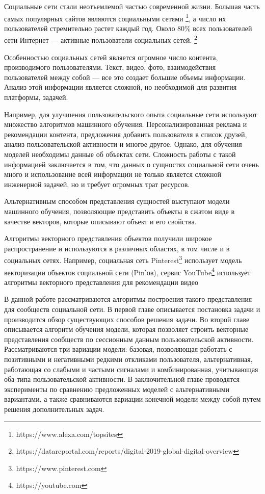 \documentclass[times,specification,annotation]{itmo-student-thesis}
\begin{document}
\startprefacepage

\startrelatedwork

Социальные сети стали неотъемлемой частью современной жизни. Большая часть самых популярных сайтов являются социальными сетями \footnote{https://www.alexa.com/topsites}, а число их пользователей стремительно растет каждый год. Около 80\% всех пользователей сети Интернет --- активные пользователи социальных сетей. \footnote{https://datareportal.com/reports/digital-2019-global-digital-overview}  

Особенностью социальных сетей является огромное число контента, производимого пользователями. Текст, видео, фото, взаимодействия пользователей между собой --- все это создает большие объемы информации. Анализ этой информации является сложной, но необходимой для развития платформы, задачей.

Например, для улучшения пользовательского опыта социальные сети используют множество алгоритмов машинного обучения. Персонализированная реклама и рекомендации контента, предложения добавить пользователя в список друзей, анализ пользовательской активности и многое другое. Однако, для обучения моделей необходимы данные об объектах сети. Сложность работы с такой информацией заключается в том, что данных о сущностях социальной сети очень много и использование всей информации не только является сложной инженерной задачей, но и требует огромных трат ресурсов.   

Альтернативным способом представления сущностей выступают модели машинного обучения, позволяющие представить объекты в сжатом виде в качестве векторов, которые описывают объект и его свойства.

Алгоритмы векторного представления объектов получили широкое распространение и используются в различных областях, в том числе и в социальных сетях. Например, социальная сеть Pinterest\footnote{https://www.pinterest.com} \cite{Liu2017} использует модель векторизации объектов социальной сети (Pin'ов), сервис YouTube\footnote{https://youtube.com} использует алгоритмы векторного представления для рекомендации видео\cite{Covington2016} 

В данной работе рассматриваются алгоритмы построения такого представления для сообществ социальной сети. В первой главе описывается постановка задачи и производится обзор существующих способов решения задачи. Во второй главе описывается алгоритм обучения модели, которая позволяет строить векторные представления сообществ по сессионным данным пользовательской активности. Рассматриваются три вариации модели: базовая, позволяющая работать с позитивными и негативными редкими откликами пользователя, альтернативная, работающая со слабыми и частыми сигналами и комбинированная, учитывающая оба типа пользовательской активности. В заключительной главе проводятся эксперименты по сравнению предложенных моделей с альтернативными вариантами, а также сравниваются вариации конечной модели между собой путем решения дополнительных задач. 
\end{document}
